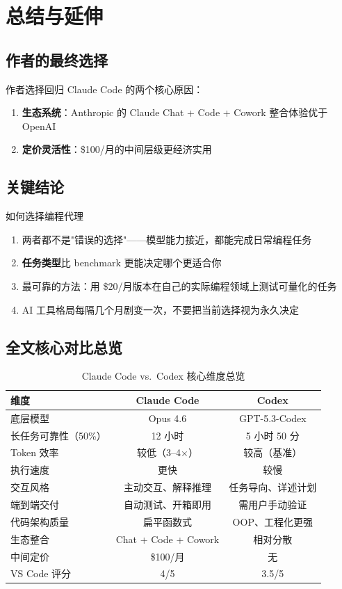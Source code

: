 \section{总结与延伸}

\subsection{作者的最终选择}

作者选择回归 Claude Code 的两个核心原因：
\begin{enumerate}
    \item \textbf{生态系统}：Anthropic 的 Claude Chat + Code + Cowork 整合体验优于 OpenAI
    \item \textbf{定价灵活性}：\$100/月的中间层级更经济实用
\end{enumerate}

\subsection{关键结论}

\begin{importantbox}{如何选择编程代理}
\begin{enumerate}
    \item 两者都不是"错误的选择"——模型能力接近，都能完成日常编程任务
    \item \textbf{任务类型}比 benchmark 更能决定哪个更适合你
    \item 最可靠的方法：用 \$20/月版本在自己的实际编程领域上测试可量化的任务
    \item AI 工具格局每隔几个月剧变一次，不要把当前选择视为永久决定
\end{enumerate}
\end{importantbox}

\subsection{全文核心对比总览}

\begin{table}[H]
\centering
\caption{Claude Code vs.\ Codex 核心维度总览}
\begin{tabular}{lcc}
\toprule
\textbf{维度} & \textbf{Claude Code} & \textbf{Codex} \\
\midrule
底层模型 & Opus 4.6 & GPT-5.3-Codex \\
长任务可靠性（50\%） & 12 小时 & 5 小时 50 分 \\
Token 效率 & 较低（3--4$\times$） & 较高（基准） \\
执行速度 & 更快 & 较慢 \\
交互风格 & 主动交互、解释推理 & 任务导向、详述计划 \\
端到端交付 & 自动测试、开箱即用 & 需用户手动验证 \\
代码架构质量 & 扁平函数式 & OOP、工程化更强 \\
生态整合 & Chat + Code + Cowork & 相对分散 \\
中间定价 & \$100/月 & 无 \\
VS Code 评分 & 4/5 & 3.5/5 \\
\bottomrule
\end{tabular}
\end{table}

